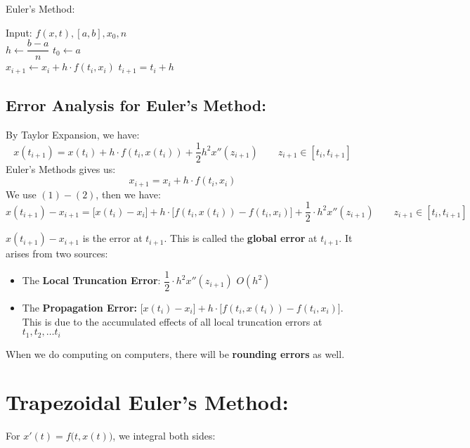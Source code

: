 \documentclass [9 pt]{article}
\theoremstyle{definition}
\begin{document}
\newpage
\begin{algorithm}
\caption{Euler's Method: }
\begin{algorithmic}[1]
\State Input: $f(x, t), [a, b], x_0, n$ 
\\
\State $h \gets \dfrac{b - a}{n}$
\State $t_0 \gets a$
\\
	\State $ x_{i+1} \gets x_i + h\cdot f(t_i, x_i) $
	\State $t_{i+1} = t_i + h$
\EndFor

\end{algorithmic}
\end{algorithm}

\subsection*{Error Analysis for Euler's Method:}
By Taylor Expansion, we have:
\begin{equation}
	x(t_{i+1}) = x(t_{i}) + h \cdot f(t_i, x(t_i)) + \dfrac{1}{2} h^2 x''(z_{i + 1}) \quad\quad z_{i+1} \in [t_i, t_{i+1}]
\end{equation}
Euler's Methods gives us:
\begin{equation}
	x_{i+1} = x_i + h\cdot f(t_i, x_i)
\end{equation}
We use $(1) - (2)$, then we have:
$$ x(t_{i+1}) - x_{i+1} = \Big[  x(t_{i}) - x_i \Big] 
		+ h \cdot \Big[ f(t_i, x(t_i)) - f(t_i, x_i) \Big] + \dfrac{1}{2} \cdot h^2 x''(z_{i+1}) \quad \quad z_{i+1} \in [t_i, t_{i+1}] $$

$x(t_{i+1}) - x_{i+1}$ is the error at $t_{i+1}$. This is called the \textbf{ global error } at $t_{i+1}$. It arises from two sources:
\begin{itemize}
	\item The \textbf{Local Truncation Error}: $ \dfrac{1}{2} \cdot h^2 x''(z_{i+1})$ \quad\quad $O(h^2)$
	\item The \textbf{Propagation Error:} $\Big[  x(t_{i}) - x_i \Big] 
		+ h \cdot \Big[ f(t_i, x(t_i)) - f(t_i, x_i) \Big]$. This is due to the accumulated effects of all local truncation errors at $t_1, t_2, \ldots t_i$   
\end{itemize}
When we do computing on computers, there will be \textbf{ rounding errors } as well.


\section*{Trapezoidal Euler's Method:}
For $x'(t) = f\Big(t, x(t)\Big)$, we integral both sides:
\end{document}
